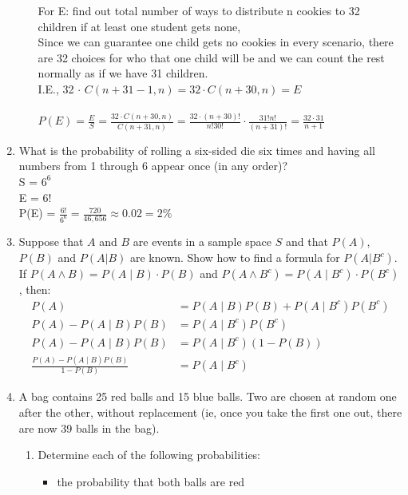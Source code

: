\documentclass{article}
\begin{document}
\begin{enumerate}
\begin{enumerate}
For E: find out total number of ways to distribute n cookies to 32 children if at least one student gets none,\\
Since we can guarantee one child gets no cookies in every scenario, there are 32 choices for who that one child will be and we can count the rest normally as if we have 31 children.\\
I.E., 32 $\cdot$ $ C(n + 31 - 1, n) = 32\cdot C(n + 30, n) =  E$\\\\
$P(E) = \frac{E}{S} = \frac{32 \cdot C(n+30, n)}{C(n + 31, n)} = \frac{32 \cdot (n+30)!}{n!30!} \cdot \frac{31!n!}{(n+31)!} = \frac{32 \cdot 31}{n+1} $

\end{enumerate}

\item What is the probability of rolling a six-sided die six times and having all numbers from 1 through 6 appear once (in any order)?\\

S = $6^6$\\
E = 6!\\
P(E) = $\frac{6!}{6^6} = \frac{720}{46,656} \approx 0.02 = 2\%$

\item Suppose that $A$ and $B$ are events in a sample space $S$ and that $P(A)$, $P(B)$ and $P(A|B)$ are known. Show how to find a formula for $P(A|B^c)$.\\
If $P(A \land B) = P(A \mid B) \cdot P(B)$ and $P(A \land B^c) = P(A \mid B^c) \cdot P(B^c)$,
then:
\begin {align}
P(A) &=  P(A \mid B) P(B) +  P(A \mid B^c) P(B^c)\\
P(A) - P(A\mid B)P(B) &= P(A \mid B^c)P(B^c)\\
P(A) - P(A\mid B)P(B) &= P(A \mid B^c)(1 - P(B))\\
\frac{P(A) - P(A \mid B)P(B)}{1 - P(B)} &= P(A \mid B^c)
\end {align}
\item A bag contains 25 red balls and 15 blue balls. Two are chosen at random one after the other, without replacement (ie, once you take the first one out, there are now 39 balls in the bag). 
\begin{enumerate} 
\item Determine each of the following probabilities:
\begin{itemize}
\item the probability that both balls are red\\


\end{itemize}
\end{enumerate}
\end{enumerate}
\end{document}
